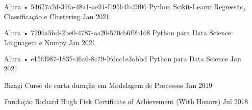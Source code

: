 \begin{cventries}
  \cventry
    {Alura • 54627a2d-31fa-48a1-ae91-f195b4b49f06} %
    {Python Scikit-Learn: Regressão, Classificação e Clustering} %
    {} %
    {Jan 2021} %
    {}

  \cventry
    {Alura • 7296a5bd-2be0-4787-aa20-570cb6f9b168} %
    {Python para Data Science: Linguagem e Numpy} %
    {} %
    {Jan 2021} %
    {}

  \cventry
    {Alura • e15f3987-1835-46a6-8c79-9fdcc1e3abbd} %
    {Python para Data Science} %
    {} %
    {Jan 2021} %
    {}

  \cventry
    {Bizagi} %
    {Curso de curta duração em Modelagem de Processos} %
    {} %
    {Jan 2019} %
    {}

  \cventry
    {Fundação Richard Hugh Fisk} %
    {Certificate of Achievement (With Honors)} %
    {} %
    {Jul 2018} %
    {}

\end{cventries} 